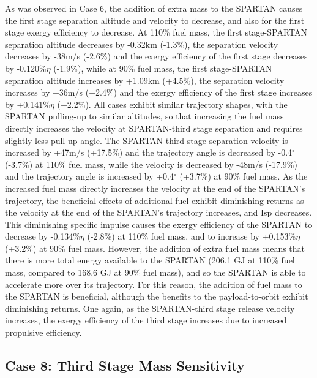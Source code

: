  As was observed in Case 6, the addition of extra mass to the SPARTAN causes the first stage separation altitude and velocity to decrease, and also for the first stage exergy efficiency to decrease. At 110\% fuel mass, the first stage-SPARTAN separation altitude decreases by -0.32km (-1.3\%), the separation velocity decreases by -38m/s (-2.6\%) and the exergy efficiency of the first stage decreases by -0.120\%$\eta$ (-1.9\%), while at 90\% fuel mass, the first stage-SPARTAN separation altitude increases by +1.09km (+4.5\%), the separation velocity increases by +36m/s (+2.4\%) and the exergy efficiency of the first stage increases by +0.141\%$\eta$ (+2.2\%).
All cases exhibit similar trajectory shapes, with the SPARTAN pulling-up to similar altitudes, so that increasing the fuel mass directly increases the velocity at SPARTAN-third stage separation and requires slightly less pull-up angle. The SPARTAN-third stage separation velocity is increased by +47m/s (+17.5\%) and the trajectory angle is decreased by -0.4$^\circ$ (-3.7\%) at 110\% fuel mass, while the velocity is decreased by -48m/s (-17.9\%) and the trajectory angle is increased by +0.4$^\circ$ (+3.7\%) at 90\% fuel mass. 
As the increased fuel mass directly increases the velocity at the end of the SPARTAN's trajectory, the beneficial effects of additional fuel exhibit diminishing returns as the velocity at the end of the SPARTAN's trajectory increases, and Isp decreases.
This diminishing specific impulse causes the exergy efficiency of the SPARTAN to decrease by -0.134\%$\eta$ (-2.8\%) at 110\% fuel mass, and to increase by +0.153\%$\eta$ (+3.2\%) at 90\% fuel mass. 
However, the addition of extra fuel mass means that there is more total energy available to the SPARTAN (206.1 GJ at 110\% fuel mass, compared to 168.6 GJ at 90\% fuel mass), and so the SPARTAN is able to accelerate more over its trajectory. For this reason, the addition of fuel mass to the SPARTAN is beneficial, although the benefits to the payload-to-orbit exhibit diminishing returns. 
One again, as the SPARTAN-third stage release velocity increases, the exergy efficiency of the third stage increases due to increased propulsive efficiency. 


\subsection{Case 8: Third Stage Mass Sensitivity}\label{sec:m3noReturn}

